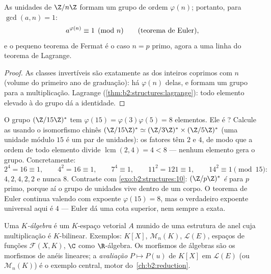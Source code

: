 \begin{theorem}\label{thm:b2:structures:euler}
As unidades de $\Z/n\Z$ formam um grupo de ordem $\varphi(n)$; portanto, para
$\gcd(a, n) = 1$:
\[
a^{\varphi(n)} \equiv 1 \pmod n
\qquad (\text{teorema de Euler\index{teorema de Euler}}),
\]
e o pequeno teorema de Fermat é o caso $n = p$ primo, agora a uma linha
do teorema de Lagrange.
\end{theorem}

\begin{proof}
As classes invertíveis são exatamente as dos inteiros coprimos com $n$
(volume do primeiro ano de graduação): há $\varphi(n)$ delas, e formam um grupo para a
multiplicação. Lagrange (\cref{thm:b2:structures:lagrange}):
todo elemento elevado à  do grupo dá a identidade.
\end{proof}

\begin{example}\label{ex:b2:structures:units15}
O grupo $(\Z/15\Z)^*$ tem $\varphi(15) = \varphi(3)\varphi(5)
= 8$ elementos. Ele é ? Calcule as  usando o isomorfismo
chinês $(\Z/15\Z)^* \simeq (\Z/3\Z)^* \times (\Z/5\Z)^*$
(uma unidade módulo $15$ é um par de unidades): os fatores têm 
$2$ e $4$, de modo que a ordem de todo elemento divide
$\operatorname{lcm}(2, 4) = 4 < 8$ --- nenhum elemento gera o grupo.
Concretamente:
\[
2^4 = 16 \equiv 1, \qquad
4^2 = 16 \equiv 1, \qquad
7^4 \equiv 1, \qquad
11^2 = 121 \equiv 1, \qquad
14^2 \equiv 1 \pmod{15} :
\]
 $4, 2, 4, 2, 2$ e nunca $8$. Contraste com
\cref{exo:b2:structures:10}: $(\Z/p\Z)^*$ \emph{é}  para
$p$ primo, porque aí o grupo de unidades vive dentro de um corpo.
O teorema de Euler continua valendo com expoente $\varphi(15) = 8$,
mas o verdadeiro expoente universal aqui é $4$ --- Euler dá uma
cota superior, nem sempre a exata.
\end{example}

\begin{definition}[Álgebra]\label{def:b2:structures:algebra}
Uma \emph{$K$-álgebra} é um $K$-espaço vetorial $A$ munido de uma
estrutura de anel cuja multiplicação é $K$-bilinear. Exemplos:
$K[X]$, $\mathcal{M}_n(K)$, $\mathcal{L}(E)$, espaços de funções
$\mathcal{F}(X, K)$, $\C$ como $\R$-álgebra. Os morfismos de álgebras
são os morfismos de anéis lineares; a \emph{avaliação} $P \mapsto P(u)$
de $K[X]$ em $\mathcal{L}(E)$ (ou $\mathcal{M}_n(K)$) é o
exemplo central, motor do~\cref{ch:b2:reduction}.
\end{definition}

